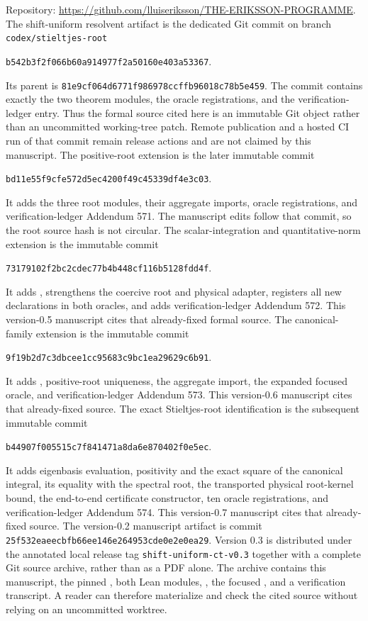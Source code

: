 \documentclass[11pt]{article}
\theoremstyle{definition}
\newcommand{\lean}[1]{\texttt{#1}}
\begin{document}
Repository:
\url{https://github.com/lluiseriksson/THE-ERIKSSON-PROGRAMME}.
The shift-uniform resolvent artifact is the dedicated Git commit on branch
\lean{codex/stieltjes-root}
\begin{center}
\small\lean{b542b3f2f066b60a914977f2a50160e403a53367}.
\end{center}
Its parent is \lean{81e9cf064d6771f986978ccffb96018c78b5e459}.  The commit contains exactly
the two theorem modules, the oracle registrations, and the verification-ledger
entry.  Thus the formal source cited here is an immutable Git object rather
than an uncommitted working-tree patch.  Remote publication and a hosted CI run
of that commit remain release actions and are not claimed by this manuscript.
The positive-root extension is the later immutable commit
\begin{center}
\small\lean{bd11e55f9cfe572d5ec4200f49c45339df4e3c03}.
\end{center}
It adds the three root
modules, their aggregate imports, oracle registrations, and verification-ledger
Addendum 571.  The manuscript edits follow that commit, so the root source hash
is not circular.
The scalar-integration and quantitative-norm extension is the immutable commit
\begin{center}
\small\lean{73179102f2bc2cdec77b4b448cf116b5128fdd4f}.
\end{center}
It adds , strengthens the coercive root
and physical adapter, registers all new declarations in both oracles, and adds
verification-ledger Addendum 572.  This version-0.5 manuscript cites that
already-fixed formal source.
The canonical-family extension is the immutable commit
\begin{center}
\small\lean{9f19b2d7c3dbcee1cc95683c9bc1ea29629c6b91}.
\end{center}
It adds , positive-root uniqueness,
the aggregate import, the expanded focused oracle, and verification-ledger
Addendum 573.  This version-0.6 manuscript cites that already-fixed source.
The exact Stieltjes-root identification is the subsequent immutable commit
\begin{center}
\small\lean{b44907f005515c7f841471a8da6e870402f0e5ec}.
\end{center}
It adds eigenbasis evaluation, positivity and the exact square of the
canonical integral, its equality with the spectral root, the transported
physical root-kernel bound, the end-to-end certificate constructor, ten oracle
registrations, and verification-ledger Addendum 574.  This version-0.7
manuscript cites that already-fixed source.
The version-0.2 manuscript artifact is commit
\lean{25f532eaeecbfb66ee146e264953cde0e2e0ea29}.  Version 0.3 is distributed
under the annotated local release tag \lean{shift-uniform-ct-v0.3} together
with a complete Git source archive, rather than as a PDF alone.  The archive
contains this manuscript, the pinned , both Lean
modules, , the focused
, and a verification transcript.  A reader can
therefore materialize and check the cited source without relying on an
uncommitted worktree.
\end{document}
